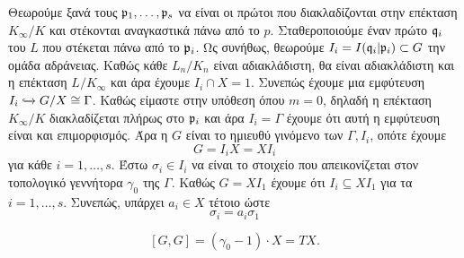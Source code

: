 Θεωρούμε ξανά τους $\mathfrak{p}_1,\ldots,\mathfrak{p}_s$ να είναι οι πρώτοι που διακλαδίζονται στην επέκταση $K_\infty/K$ και στέκονται αναγκαστικά πάνω από το $p$. Σταθεροποιούμε έναν πρώτο $\mathfrak{q}_i$ του $L$ που στέκεται πάνω από το $\mathfrak{p}_i$.
Ως συνήθως, θεωρούμε $I_i = I(\mathfrak{q}_i | \mathfrak{p}_i) \subset G$ την ομάδα αδράνειας. Καθώς κάθε $L_n/K_n$ είναι αδιακλάδιστη, θα είναι αδιακλάδιστη και η επέκταση $L/K_\infty$ και άρα έχουμε $I_i \cap X = 1$. Συνεπώς έχουμε μια εμφύτευση
$I_i \xhookrightarrow{} G/X \cong \Gamma$. Καθώς είμαστε στην υπόθεση όπου $m=0$, δηλαδή η επέκταση $K_\infty/K$ διακλαδίζεται πλήρως στο $\mathfrak{p}_i$ και άρα $I_i = \Gamma$ έχουμε ότι αυτή η εμφύτευση είναι και επιμορφισμός. Άρα η $G$ είναι το ημιευθύ γινόμενο των $\Gamma, I_i$, οπότε έχουμε
$$G = I_i X = X I_i$$ για κάθε $i=1,\ldots ,s$.
Έστω $\sigma_i \in I_i$ να είναι το στοιχείο που απεικονίζεται στον τοπολογικό γεννήτορα $\gamma_0$ της $\Gamma$. Καθώς $G=XI_1$ έχουμε ότι $I_i\subseteq XI_1$ για τα $i=1,\ldots,s$. Συνεπώς, υπάρχει $a_i \in X$ τέτοιο ώστε
$$\sigma_i = a_i \sigma_1$$

\begin{lemma}
    $$[G,G] = (\gamma_0 -1) \cdot X = TX.$$
\end{lemma}


